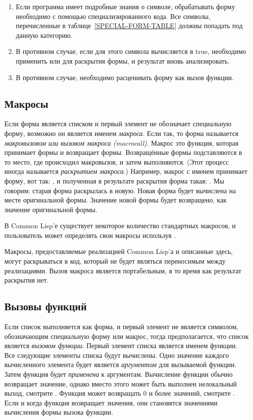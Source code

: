 \begin{enumerate}
\item
  Если программа имеет подробные знания о символе, обрабатывать форму необходимо с
  помощью специализированного кода. Все символы, перечисленные в
  таблице~\ref{SPECIAL-FORM-TABLE} должны попадать под данную категорию.

\item
  В противном случае, если для этого символа  вычисляется в
  true, необходимо применить  или  для раскрытия
  формы, и результат вновь анализировать.

\item
  В противном случае, необходимо расценивать форму как вызов функции.
\end{enumerate}

\subsection{Макросы}

Если форма является списком и первый элемент не обозначает специальную
форму, возможно он является именем \emph{макроса}. Если так, то форма
называется \emph{макровызовом или вызовом макроса (macrocall)}. Макрос
это функция, которая принимает формы и возвращает формы. Возвращённые формы
подставляются в то место, где происходил макровызов, и затем выполняются. (Этот
процесс иногда называется \emph{раскрытием макроса}.)
Например, макрос с именем  принимает форму, вот так: ,
и полученная в результате раскрытия форма такая: . Мы
говорим: старая форма раскрылась в новую. Новая форма будет вычислена на месте
оригинальной формы. Значение новой формы будет возвращено, как значение
оригинальной формы.

В Common Lisp'е существует некоторое количество стандартных макросов, и
пользователь может определять свои макросы используя .

Макросы, предоставляемые реализацией Common Lisp'а и описанные здесь, могут
раскрываться в код, который не будет являться переносимым между реализациями.
Вызов макроса является портабельным, в то время как результат раскрытия нет.

\subsection{Вызовы функций}

Если список выполняется как форма, и первый элемент не является символом,
обозначающим специальную форму или макрос, тогда предполагается, что список
является \emph{вызовом функции}. Первый элемент списка является именем
функции. Все следующие элементы списка будут вычислены. Одно значение каждого
вычисленного элемента будет является \emph{аргументом} для вызываемой
функции. 
Затем функция будет \emph{применена} к аргументам. Вычисление функции обычно
возвращает значение, однако вместо этого может быть выполнен нелокальный выход,
смотрите . Функция может возвращать 0 и более значений, смотрите
. 
Если и когда функция возвращает значения, они становятся значениями вычисления
формы вызова функции.


